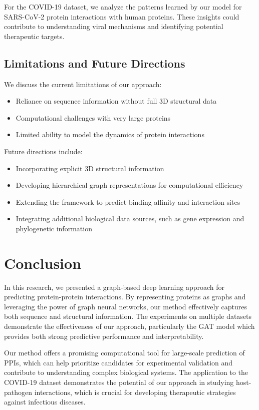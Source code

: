 \documentclass[12pt,a4paper]{article}
\begin{document}
For the COVID-19 dataset, we analyze the patterns learned by our model for SARS-CoV-2 protein interactions with human proteins. These insights could contribute to understanding viral mechanisms and identifying potential therapeutic targets.

\subsection{Limitations and Future Directions}
\label{sec:limitations}

We discuss the current limitations of our approach:
\begin{itemize}
    \item Reliance on sequence information without full 3D structural data
    \item Computational challenges with very large proteins
    \item Limited ability to model the dynamics of protein interactions
\end{itemize}

Future directions include:
\begin{itemize}
    \item Incorporating explicit 3D structural information
    \item Developing hierarchical graph representations for computational efficiency
    \item Extending the framework to predict binding affinity and interaction sites
    \item Integrating additional biological data sources, such as gene expression and phylogenetic information
\end{itemize}

\section{Conclusion}
\label{sec:conclusion}

In this research, we presented a graph-based deep learning approach for predicting protein-protein interactions. By representing proteins as graphs and leveraging the power of graph neural networks, our method effectively captures both sequence and structural information. The experiments on multiple datasets demonstrate the effectiveness of our approach, particularly the GAT model which provides both strong predictive performance and interpretability.

Our method offers a promising computational tool for large-scale prediction of PPIs, which can help prioritize candidates for experimental validation and contribute to understanding complex biological systems. The application to the COVID-19 dataset demonstrates the potential of our approach in studying host-pathogen interactions, which is crucial for developing therapeutic strategies against infectious diseases.
\end{document}
